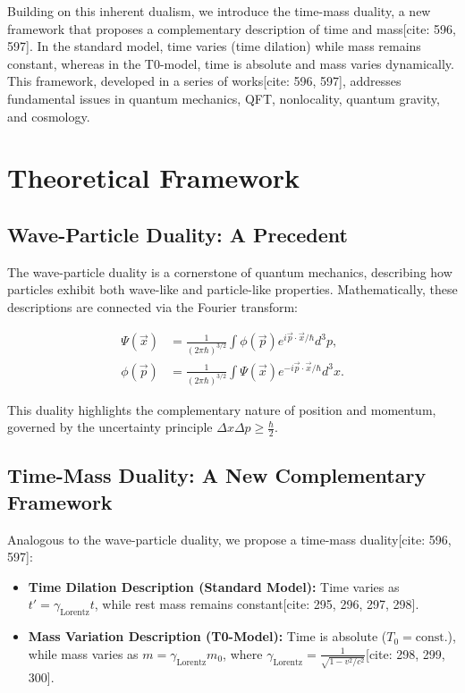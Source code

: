 \documentclass[a4paper,12pt]{article}
\newcommand{\gammaf}{\gamma_{\text{Lorentz}}}
\theoremstyle{definition}
\theoremstyle{remark}
\begin{document}
	Building on this inherent dualism, we introduce the time-mass duality, a new framework that proposes a complementary description of time and mass[cite: 596, 597]. In the standard model, time varies (time dilation) while mass remains constant, whereas in the T0-model, time is absolute and mass varies dynamically. This framework, developed in a series of works[cite: 596, 597], addresses fundamental issues in quantum mechanics, QFT, nonlocality, quantum gravity, and cosmology.
	
	\section{Theoretical Framework}
	
	\subsection{Wave-Particle Duality: A Precedent}
	
	The wave-particle duality is a cornerstone of quantum mechanics, describing how particles exhibit both wave-like and particle-like properties. Mathematically, these descriptions are connected via the Fourier transform:
	
	\begin{align}
		\Psi(\vec{x}) &= \frac{1}{(2\pi\hbar)^{3/2}} \int \phi(\vec{p}) e^{i\vec{p}\cdot\vec{x}/\hbar} d^3p, \\
		\phi(\vec{p}) &= \frac{1}{(2\pi\hbar)^{3/2}} \int \Psi(\vec{x}) e^{-i\vec{p}\cdot\vec{x}/\hbar} d^3x.
	\end{align}
	
	This duality highlights the complementary nature of position and momentum, governed by the uncertainty principle \( \Delta x \Delta p \geq \frac{\hbar}{2} \).
	
	\subsection{Time-Mass Duality: A New Complementary Framework}
	
	Analogous to the wave-particle duality, we propose a time-mass duality[cite: 596, 597]:
	
	\begin{itemize}
		\item \textbf{Time Dilation Description (Standard Model):} Time varies as \( t' = \gammaf t \), while rest mass remains constant[cite: 295, 296, 297, 298].
		\item \textbf{Mass Variation Description (T0-Model):} Time is absolute (\( T_0 = \text{const.} \)), while mass varies as \( m = \gammaf m_0 \), where \( \gammaf = \frac{1}{\sqrt{1 - v^2/c^2}} \)[cite: 298, 299, 300].
	\end{itemize}
	
\end{document}
